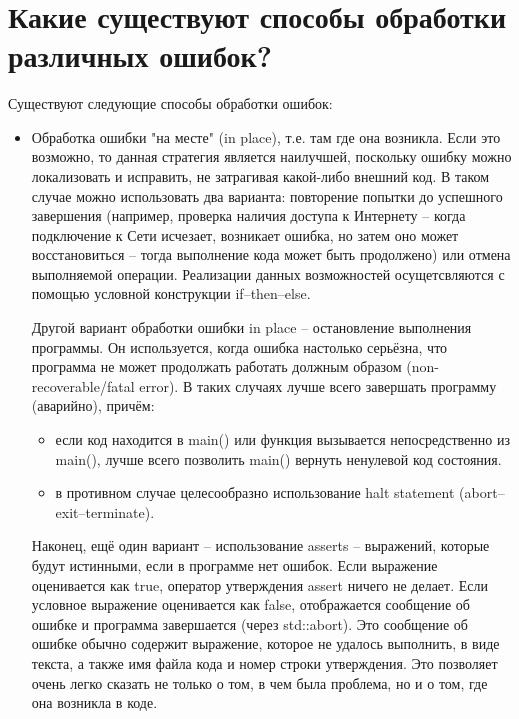 \documentclass[a4paper,12pt]{article}	%
\title{
	\center{\textbf{Контрольные вопросы}}
	}
\begin{document}

\maketitle

\section{Какие существуют способы обработки различных ошибок?}
	
	Существуют следующие способы обработки ошибок:
	
	\begin{itemize}
	
		\item Обработка ошибки "на месте" (in place), т.е. там где она возникла. Если это возможно, то данная стратегия является наилучшей, поскольку ошибку можно локализовать и исправить, не затрагивая какой-либо внешний код. В таком случае можно использовать два варианта: повторение попытки до успешного завершения (например, проверка наличия доступа к Интернету -- когда подключение к Сети исчезает, возникает ошибка, но затем оно может восстановиться -- тогда выполнение кода может быть продолжено) или отмена выполняемой операции. Реализации данных возможностей осущетсвляются с помощью условной конструкции if--then--else.
		
		Другой вариант обработки ошибки in place -- остановление выполнения программы. Он используется, когда ошибка настолько серьёзна, что программа не может продолжать работать должным образом (non-recoverable/fatal error). В таких случаях лучше всего завершать программу (аварийно), причём:
		
		\begin{itemize}
		
			\item если код находится в main() или функция вызывается непосредственно из main(), лучше всего позволить main() вернуть ненулевой код состояния.
			
			\item в противном случае целесообразно использование halt statement (abort--exit--terminate).
			
		\end{itemize}
		
		Наконец, ещё один вариант -- использование asserts --  выражений, которые будут истинными, если в программе нет ошибок. Если выражение оценивается как true, оператор утверждения assert ничего не делает. Если условное выражение оценивается как false, отображается сообщение об ошибке и программа завершается (через std::abort). Это сообщение об ошибке обычно содержит выражение, которое не удалось выполнить, в виде текста, а также имя файла кода и номер строки утверждения. Это позволяет очень легко сказать не только о том, в чем была проблема, но и о том, где она возникла в коде.


\end{itemize}
\end{document}
